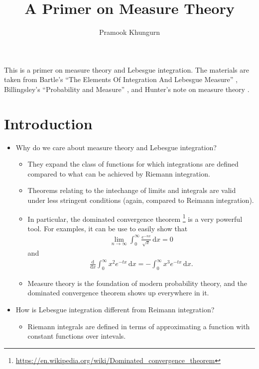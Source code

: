 \documentclass[10pt]{article}
\title{A Primer on Measure Theory}
\author{Pramook Khungurn}
\newcommand{\dee}{\mathrm{d}}
\begin{document}
\maketitle

This is a primer on measure theory and Lebesgue integration. The materials are taken from Bartle's ``The Elements Of Integration And Lebesgue Measure'' \cite{Bartle:1995}, Billingsley's ``Probability and Measure'' \cite{Billingsley:1995}, and Hunter's note on measure theory \cite{Hunter:2011}.

\section{Introduction}

\begin{itemize}
  \item Why do we care about measure theory and Lebesgue integration?
  \begin{itemize}
    \item They expand the class of functions for which integrations are defined compared to what can be achieved by Riemann integration.
    
    \item Theorems relating to the intechange of limits and integrals are valid under less stringent conditions (again, compared to Reimann integration).
    
    \item In particular, the dominated convergence theorem \footnote{\url{https://en.wikipedia.org/wiki/Dominated_convergence_theorem}} is a very powerful tool. For examples, it can be use to easily show that
    \begin{align*}
      \lim_{n \rightarrow \infty} \int_{0}^\infty \frac{e^{-nx}}{\sqrt{x}}\, \dee x = 0
    \end{align*}
    and
    \begin{align*}
        \frac{\dee}{\dee x} \int_{0}^\infty x^2 e^{-tx}\, \dee x = -\int_0^\infty x^3 e^{-tx}\, \dee x.
    \end{align*}
    
    \item Measure theory is the foundation of modern probability theory, and the dominated convergence theorem shows up everywhere in it.
  \end{itemize}
  
  \item How is Lebesgue integration different from Reimann integration?
  \begin{itemize}
    \item Riemann integrals are defined in terms of approximating a function with constant functions over intevals.
    

\end{itemize}
\end{itemize}
\end{document}

